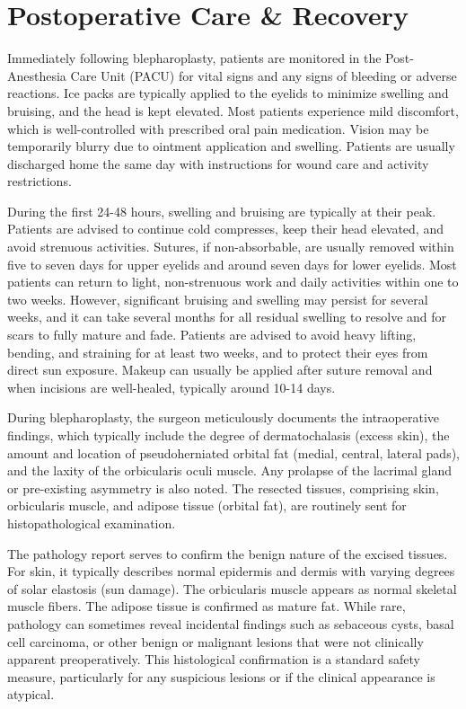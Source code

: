 \section*{Postoperative Care \& Recovery}
Immediately following blepharoplasty, patients are monitored in the Post-Anesthesia Care Unit (PACU) for vital signs and any signs of bleeding or adverse reactions. Ice packs are typically applied to the eyelids to minimize swelling and bruising, and the head is kept elevated. Most patients experience mild discomfort, which is well-controlled with prescribed oral pain medication. Vision may be temporarily blurry due to ointment application and swelling. Patients are usually discharged home the same day with instructions for wound care and activity restrictions.

During the first 24-48 hours, swelling and bruising are typically at their peak. Patients are advised to continue cold compresses, keep their head elevated, and avoid strenuous activities. Sutures, if non-absorbable, are usually removed within five to seven days for upper eyelids and around seven days for lower eyelids. Most patients can return to light, non-strenuous work and daily activities within one to two weeks. However, significant bruising and swelling may persist for several weeks, and it can take several months for all residual swelling to resolve and for scars to fully mature and fade. Patients are advised to avoid heavy lifting, bending, and straining for at least two weeks, and to protect their eyes from direct sun exposure. Makeup can usually be applied after suture removal and when incisions are well-healed, typically around 10-14 days.

During blepharoplasty, the surgeon meticulously documents the intraoperative findings, which typically include the degree of dermatochalasis (excess skin), the amount and location of pseudoherniated orbital fat (medial, central, lateral pads), and the laxity of the orbicularis oculi muscle. Any prolapse of the lacrimal gland or pre-existing asymmetry is also noted. The resected tissues, comprising skin, orbicularis muscle, and adipose tissue (orbital fat), are routinely sent for histopathological examination.

The pathology report serves to confirm the benign nature of the excised tissues. For skin, it typically describes normal epidermis and dermis with varying degrees of solar elastosis (sun damage). The orbicularis muscle appears as normal skeletal muscle fibers. The adipose tissue is confirmed as mature fat. While rare, pathology can sometimes reveal incidental findings such as sebaceous cysts, basal cell carcinoma, or other benign or malignant lesions that were not clinically apparent preoperatively. This histological confirmation is a standard safety measure, particularly for any suspicious lesions or if the clinical appearance is atypical.

